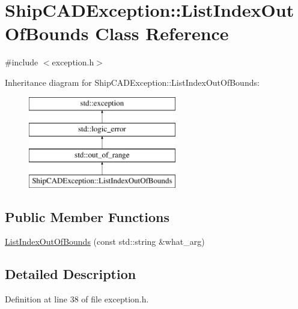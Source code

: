 \hypertarget{classShipCADException_1_1ListIndexOutOfBounds}{\section{Ship\-C\-A\-D\-Exception\-:\-:List\-Index\-Out\-Of\-Bounds Class Reference}
\label{classShipCADException_1_1ListIndexOutOfBounds}
}


{\ttfamily \#include $<$exception.\-h$>$}

Inheritance diagram for Ship\-C\-A\-D\-Exception\-:\-:List\-Index\-Out\-Of\-Bounds\-:\begin{figure}[H]
\begin{center}
\leavevmode
\includegraphics[height=4.000000cm]{classShipCADException_1_1ListIndexOutOfBounds}
\end{center}
\end{figure}
\subsection*{Public Member Functions}
\begin{DoxyCompactItemize}
\item 
\hyperlink{classShipCADException_1_1ListIndexOutOfBounds_a156855cdf77b85b6b223cbffced87429}{List\-Index\-Out\-Of\-Bounds} (const std\-::string \&what\-\_\-arg)
\end{DoxyCompactItemize}


\subsection{Detailed Description}


Definition at line 38 of file exception.\-h.




